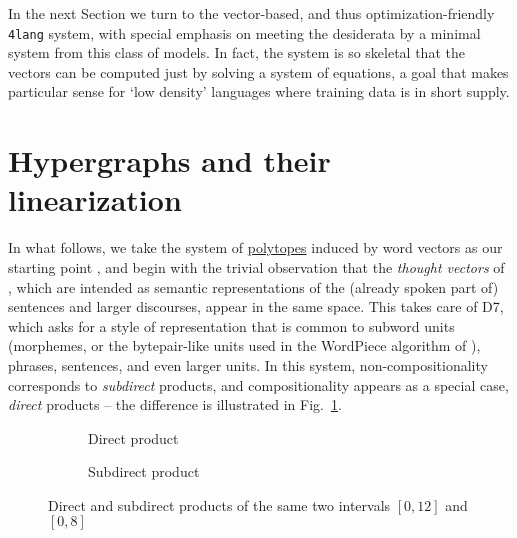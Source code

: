 \documentclass[output=paper,colorlinks=true,citecolor=brown]{langscibook}
\begin{document}
In the next Section we turn to the vector-based, and thus
optimization-friendly \texttt{4lang} system, with special emphasis on meeting
the desiderata by a minimal system from this class of models. In fact, the
system is so skeletal that the vectors can be computed just by solving a
system of equations, a goal that makes particular sense for `low density'
languages where training data is in short supply.

\section{Hypergraphs and their linearization}\label{4lang}

In what follows, we take the system of
\href{https://en.wikipedia.org/wiki/Polytope}{polytopes} induced by word
vectors as our starting point \citep{Kornai:2022}, and begin with the trivial
observation that the \emph{thought vectors} of \citet{LeCun:2015}, which are
intended as semantic representations of the (already spoken part of) sentences
and larger discourses, appear in the same space. This takes care of D7, which
asks for a style of representation that is common to subword units (morphemes,
or the bytepair-like units used in the WordPiece algorithm of \cite{Wu:2016}),
phrases, sentences, and even larger units. In this system,
non-compositionality corresponds to \emph{subdirect} products, and
compositionality appears as a special case, \emph{direct} products
\citep{Kornai:2010} -- the difference is illustrated in
Fig.~\ref{fig:dirsubdir}.


\begin{figure}[h]
    \centering
    \begin{subfigure}[t]{0.5\textwidth}
	\centering
        \caption{Direct product}
    \end{subfigure}%
    \begin{subfigure}[t]{0.5\textwidth}
        \centering
                \caption{Subdirect product}
    \end{subfigure}
    \caption{Direct and subdirect products of the same two intervals $[0,12]$ and $[0,8]$}\label{fig:dirsubdir}
\end{figure}
\end{document}

